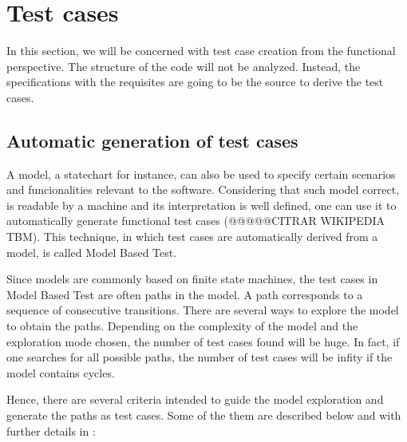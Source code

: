 \chapter{Test cases}
\label{cap:testgen}

In this section, we will be concerned with test case creation from the functional perspective. The structure of the code will not be analyzed. Instead, the specifications with the requisites are going to be the source to derive the test cases.



\section{Automatic generation of test cases}

A model, a statechart for instance, can also be used to specify certain scenarios and funcionalities relevant to the software. Considering that such model correct, is readable by a machine and its interpretation is well defined, one can use it to automatically generate functional test cases \cite{Maldonado:07}(@@@@@CITRAR WIKIPEDIA TBM). This technique, in which test cases are automatically derived from a model, is called Model Based Test.

Since models are commonly based on finite state machines, the test cases in Model Based Test are often paths in the model. A path corresponds to a sequence of consecutive transitions. There are several ways to explore the model to obtain the paths. Depending on the complexity of the model and the exploration mode chosen, the number of test cases found will be huge. In fact, if one searches for all possible paths, the number of test cases will be infity if the model contains cycles.

Hence, there are several criteria intended to guide the model exploration and generate the paths as test cases. Some of the them are described below and with further details in \cite{inpe10}:

